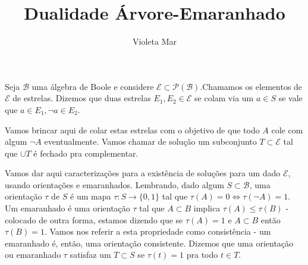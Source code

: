 \documentclass[11pt]{article}
\title{Dualidade Árvore-Emaranhado}
\author{Violeta Mar}
\date{}
\theoremstyle{definition}
\theoremstyle{definition}
\theoremstyle{definition}
\theoremstyle{definition}
\theoremstyle{definition}
\theoremstyle{definition}
\theoremstyle{definition}
\theoremstyle{definition}
\theoremstyle{definition}
\theoremstyle{definition}
\theoremstyle{definition}
\theoremstyle{definition}
\theoremstyle{definition}
\theoremstyle{definition}
\begin{document}
\maketitle

Seja $\mathcal{B}$ uma álgebra de Boole e considere $\mathcal{E} \subset \mathcal{P}(\mathcal{B})$.Chamamos os elementos de $\mathcal{E}$ de estrelas. Dizemos que duas estrelas $E_1,E_2 \in \mathcal{E}$ se colam via um $a \in S$ se vale que $a \in E_1, \lnot a \in E_2$.

Vamos brincar aqui de colar estas estrelas com o objetivo de que todo $A$ cole com algum $\lnot A$ eventualmente. Vamos chamar de solução um subconjunto $T \subset \mathcal{E}$ tal que $\cup T$ é fechado pra complementar.

Vamos dar aqui caracterizações para a existência de soluções para um dado $\mathcal{E}$, usando orientações e emaranhados. Lembrando, dado algum $S \subset \mathcal{B}$, uma orientação $\tau$ de $S$ é um mapa $\tau: S \rightarrow \{0,1\}$ tal que $\tau(A) = 0 \iff \tau(\lnot A) = 1$. Um emaranhado é uma orientação $\tau$ tal que $A\subset B$ implica $\tau(A) \leq \tau(B)$ - colocado de outra forma, estamos dizendo que se $\tau(A) = 1$ e $A \subset B$ então $\tau(B) = 1$. Vamos nos referir a esta propriedade como consistência - um emaranhado é, então, uma orientação consistente. Dizemos que uma orientação ou emaranhado $\tau$ satisfaz um $T \subset S$ se $\tau(t) = 1$ pra todo $t \in T$.
\end{document}
